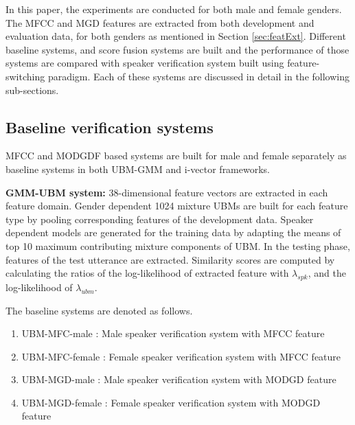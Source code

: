 \documentclass{article}
\begin{document}
In this paper, the experiments are conducted for both male and female genders. The MFCC and MGD features are extracted from both development and evaluation data, for both genders as mentioned in Section \ref{sec:featExt}. Different baseline systems, and score fusion systems are built and the performance of those systems are compared with speaker verification system built using feature-switching paradigm. Each of these systems are discussed in detail in the following sub-sections. 

\subsection{Baseline verification systems}
\label{subsec:baseline}
MFCC and MODGDF based systems are built for male and female separately as baseline systems in both UBM-GMM and i-vector frameworks.  

\vspace*{0.25cm}

\textbf{GMM-UBM system:} 38-dimensional feature vectors are extracted in each feature domain. Gender dependent 1024 mixture UBMs are built for each feature type by pooling corresponding features of the development data. Speaker dependent models are generated for the training data by adapting the means of top 10 maximum contributing mixture components of UBM. In the testing phase, features of the test utterance are extracted. Similarity scores are computed by calculating the ratios of the log-likelihood of extracted feature with $\lambda_{spk}$, and  the log-likelihood of $\lambda_{ubm}$. 

The baseline systems are denoted as follows.
\begin{enumerate}
\item UBM-MFC-male : Male speaker verification system with MFCC feature
\item UBM-MFC-female : Female speaker verification system with MFCC feature
\item UBM-MGD-male : Male speaker verification system with MODGD feature
\item UBM-MGD-female : Female speaker verification system with MODGD feature
\end{enumerate}
\end{document}

